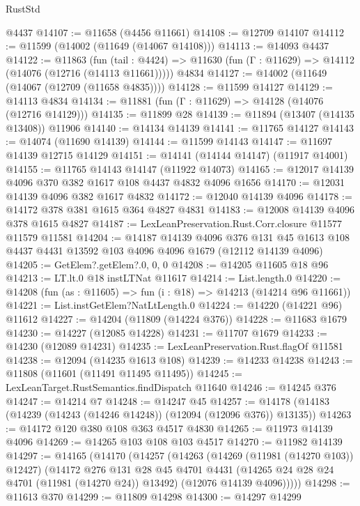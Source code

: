 \begin{lexlean}{RustStd}
\begin{coremodule}
    @4437
@14107 := @11658 (@4456 @11661)
@14108 := @12709 @14107
@14112 := @11599 (@14002 (@11649 (@14067 @14108)))
@14113 := @14093 @4437
@14122 := @11863
    (fun (tail : @4424) => @11630 (fun (Γ : @11629) => @14112 (@14076 (@12716 (@14113 @11661)))))
    @4834
@14127 := @14002 (@11649 (@14067 (@12709 (@11658 @4835))))
@14128 := @11599 @14127
@14129 := @14113 @4834
@14134 := @11881 (fun (Γ : @11629) => @14128 (@14076 (@12716 @14129)))
@14135 := @11899 @28
@14139 := @11894 (@13407 (@14135 @13408)) @11906
@14140 := @14134 @14139
@14141 := @11765 @14127
@14143 := @14074 (@11690 @14139)
@14144 := @11599 @14143
@14147 := @11697 @14139 @12715 @14129
@14151 := @14141 (@14144 @14147) (@11917 @14001)
@14155 := @11765 @14143 @14147 (@11922 @14073)
@14165 := @12017 @14139 @4096 @370 @382 @1617 @108 @4437 @4832 @4096 @1656
@14170 := @12031 @14139 @4096 @382 @1617 @4832
@14172 := @12040 @14139 @4096
@14178 := @14172 @378 @381 @1615 @364 @4827 @4831
@14183 := @12008 @14139 @4096 @378 @1615 @4827
@14187 := LexLeanPreservation.Rust.Corr.closure @11577 @11579 @11581
@14204 := @14187
    @14139
    @4096
    @376
    @131
    @45
    @1613
    @108
    @4437
    @4431
    @13592
    @103
    @4096
    @4096
    @1679
    (@12112 @14139 @4096)
@14205 := GetElem?.getElem?.{0, 0, 0}
@14208 := @14205 @11605 @18 @96
@14213 := LT.lt.{0} @18 instLTNat @11617
@14214 := List.length.{0}
@14220 := @14208 (fun (as : @11605) => fun (i : @18) => @14213 (@14214 @96 @11661))
@14221 := List.instGetElem?NatLtLength.{0}
@14224 := @14220 (@14221 @96) @11612
@14227 := @14204 (@11809 (@14224 @376))
@14228 := @11683 @1679
@14230 := @14227 (@12085 @14228)
@14231 := @11707 @1679
@14233 := @14230 (@12089 @14231)
@14235 := LexLeanPreservation.Rust.flagOf @11581
@14238 := @12094 (@14235 @1613 @108)
@14239 := @14233 @14238
@14243 := @11808 (@11601 (@11491 @11495 @11495))
@14245 := LexLeanTarget.RustSemantics.findDispatch @11640
@14246 := @14245 @376
@14247 := @14214 @7
@14248 := @14247 @45
@14257 := @14178 (@14183 (@14239 (@14243 (@14246 @14248)) (@12094 (@12096 @376)) @13135))
@14263 := @14172 @120 @380 @108 @363 @4517 @4830
@14265 := @11973 @14139 @4096
@14269 := @14265 @103 @108 @103 @4517
@14270 := @11982 @14139
@14297 := @14165
    (@14170
      (@14257
        (@14263
          (@14269 (@11981 (@14270 @103)) @12427)
          (@14172
            @276
            @131
            @28
            @45
            @4701
            @4431
            (@14265 @24 @28 @24 @4701 (@11981 (@14270 @24)) @13492)
            (@12076 @14139 @4096)))))
@14298 := @11613 @370
@14299 := @11809 @14298
@14300 := @14297 @14299

\end{coremodule}
\end{lexlean}
